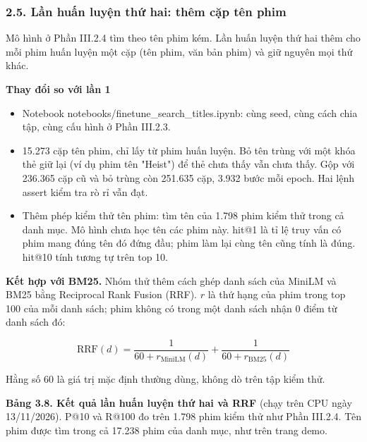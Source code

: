 \documentclass[12pt,a4paper]{article}
\providecommand{\tightlist}{\setlength{\itemsep}{0pt}\setlength{\parskip}{0pt}}
\newcommand{\np}{\Needspace{8\baselineskip}}
\newcommand{\lbl}[1]{\Needspace{6\baselineskip}\textbf{#1}\par\nopagebreak}
\let\oldsubsubsection\subsubsection
\renewcommand{\subsubsection}{\Needspace{10\baselineskip}\oldsubsubsection}
\begin{document}
\subsubsection{2.5. Lần huấn luyện thứ hai: thêm cặp tên phim}

Mô hình ở Phần III.2.4 tìm theo tên phim kém. Lần huấn luyện thứ hai thêm cho mỗi phim huấn luyện một cặp (tên phim, văn bản phim) và giữ nguyên mọi thứ khác.

\lbl{Thay đổi so với lần 1}

\begin{itemize}
\tightlist
\item Notebook notebooks/finetune\_search\_titles.ipynb: cùng seed, cùng cách chia tập, cùng cấu hình ở Phần III.2.3.
\item 15.273 cặp tên phim, chỉ lấy từ phim huấn luyện. Bỏ tên trùng với một khóa thẻ giữ lại (ví dụ phim tên "Heist") để thẻ chưa thấy vẫn chưa thấy. Gộp với 236.365 cặp cũ và bỏ trùng còn 251.635 cặp, 3.932 bước mỗi epoch. Hai lệnh assert kiểm tra rò rỉ vẫn đạt.
\item Thêm phép kiểm thử tên phim: tìm tên của 1.798 phim kiểm thử trong cả danh mục. Mô hình chưa học tên các phim này. hit@1 là tỉ lệ truy vấn có phim mang đúng tên đó đứng đầu; phim làm lại cùng tên cũng tính là đúng. hit@10 tính tương tự trên top 10.
\end{itemize}

\textbf{Kết hợp với BM25.} Nhóm thử thêm cách ghép danh sách của MiniLM và BM25 bằng Reciprocal Rank Fusion (RRF). $r$ là thứ hạng của phim trong top 100 của mỗi danh sách; phim không có trong một danh sách nhận 0 điểm từ danh sách đó:

\[
\mathrm{RRF}(d)=\frac{1}{60+r_{\mathrm{MiniLM}}(d)}+\frac{1}{60+r_{\mathrm{BM25}}(d)}
\]

Hằng số 60 là giá trị mặc định thường dùng, không dò trên tập kiểm thử.

\np\textbf{Bảng 3.8. Kết quả lần huấn luyện thứ hai và RRF} (chạy trên CPU ngày 13/11/2026). P@10 và R@100 đo trên 1.798 phim kiểm thử như Phần III.2.4. Tên phim được tìm trong cả 17.238 phim của danh mục, như trên trang demo.
\end{document}
